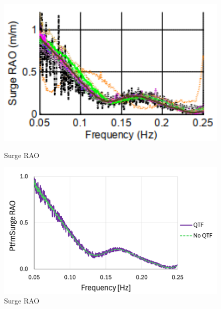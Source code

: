 \documentclass[a4paper, 11pt]{article}
\begin{document}
\begin{figure}[H]
    \begin{minipage}{0.48\textwidth}
        \centering
        \includegraphics[width=1\textwidth]{2.6_surge.png}
        \caption{\small Surge RAO \cite{Robertson2014}} 
        \label{fig:2.6_surge}
    \end{minipage}
    \hfill
    \begin{minipage}{0.5\textwidth}
        \centering
        \vspace{-0.2cm}
        \includegraphics[width=1\textwidth]{2.6_surge_mine.png}
        \caption{\small Surge RAO}
        \label{fig:2.6_surge_mine}
    \end{minipage}
\end{figure}
\end{document}
